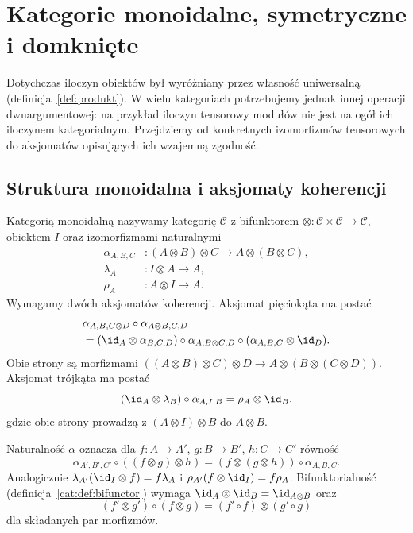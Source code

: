 \section{Kategorie monoidalne, symetryczne i domknięte}\label{cat:sec:monoidal}

Dotychczas iloczyn obiektów był wyróżniany przez własność uniwersalną (definicja~\ref{def:produkt}). W wielu kategoriach potrzebujemy jednak innej operacji dwuargumentowej: na przykład iloczyn tensorowy modułów nie jest na ogół ich iloczynem kategorialnym. Przejdziemy od konkretnych izomorfizmów tensorowych do aksjomatów opisujących ich wzajemną zgodność.

\subsection{Struktura monoidalna i aksjomaty koherencji}
\begin{definicja}\label{cat:def:monoidal}
Kategorią monoidalną nazywamy kategorię $\mathcal C$ z bifunktorem $\otimes:\mathcal C\times\mathcal C\to\mathcal C$, obiektem $I$ oraz izomorfizmami naturalnymi
\[
\begin{aligned}
\alpha_{A,B,C}&:(A\otimes B)\otimes C\longrightarrow A\otimes(B\otimes C),\\
\lambda_A&:I\otimes A\longrightarrow A,\\
\rho_A&:A\otimes I\longrightarrow A.
\end{aligned}
\]
Wymagamy dwóch aksjomatów koherencji. Aksjomat pięciokąta ma postać
\begin{equation}\label{cat:eq:pentagon}
\begin{aligned}
&\alpha_{A,B,C\otimes D}\circ\alpha_{A\otimes B,C,D}\\
&=(\id_A\otimes\alpha_{B,C,D})\circ\alpha_{A,B\otimes C,D}
\circ(\alpha_{A,B,C}\otimes\id_D).
\end{aligned}
\end{equation}
Obie strony są morfizmami $((A\otimes B)\otimes C)\otimes D\to A\otimes(B\otimes(C\otimes D))$.
Aksjomat trójkąta ma postać
\begin{equation}\label{cat:eq:triangle-monoidal}
(\id_A\otimes\lambda_B)\circ\alpha_{A,I,B}=\rho_A\otimes\id_B,
\end{equation}
gdzie obie strony prowadzą z $(A\otimes I)\otimes B$ do $A\otimes B$.
\end{definicja}

Naturalność $\alpha$ oznacza dla $f:A\to A'$, $g:B\to B'$, $h:C\to C'$ równość
\[
\alpha_{A',B',C'}\circ((f\otimes g)\otimes h)
=(f\otimes(g\otimes h))\circ\alpha_{A,B,C}.
\]
Analogicznie $\lambda_{A'}(\id_I\otimes f)=f\lambda_A$ i $\rho_{A'}(f\otimes\id_I)=f\rho_A$. Bifunktorialność (definicja~\ref{cat:def:bifunctor}) wymaga $\id_A\otimes\id_B=\id_{A\otimes B}$ oraz
\[
(f'\otimes g')\circ(f\otimes g)=(f'\circ f)\otimes(g'\circ g)
\]
dla składanych par morfizmów.

